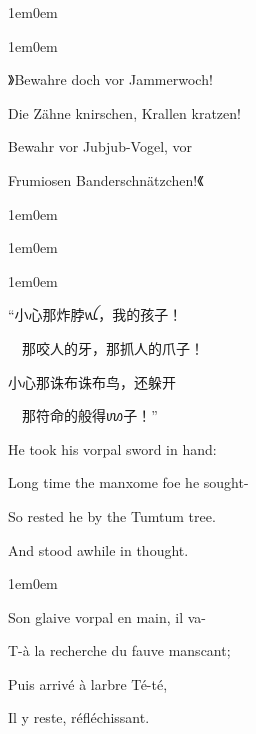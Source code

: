 \documentclass[
  12pt,
  twoside,
  openright,
  oldfontcommands,
]{memoir}
\begin{document}
\hfill\break

\begin{adjustwidth}{1em}{0em}

\begin{adjustwidth}{1em}{0em}

》Bewahre doch vor Jammerwoch!

Die Zähne knirschen, Krallen kratzen!

Bewahr\textquotesingle{} vor Jubjub-Vogel, vor

Frumiosen Banderschnätzchen!《

\end{adjustwidth}

\end{adjustwidth}

\hfill\break

\begin{adjustwidth}{1em}{0em}

\begin{adjustwidth}{1em}{0em}

\begin{adjustwidth}{1em}{0em}

``小心那炸脖{\gebfont ꪡ}，我的孩子！

　那咬人的牙，那抓人的爪子！

小心那诛布诛布鸟，还躲开

　那符命的般得{\gebfont ꪪ}子！''

\end{adjustwidth}

\end{adjustwidth}

\end{adjustwidth}

\hfill\break

He took his vorpal sword in hand:

Long time the manxome foe he sought-

So rested he by the Tumtum tree.

And stood awhile in thought.

\hfill\break

\begin{adjustwidth}{1em}{0em}

Son glaive vorpal en main, il va-

T-à la recherche du fauve manscant;

Puis arrivé à l\textquotesingle arbre Té-té,

Il y reste, réfléchissant.

\end{adjustwidth}
\end{document}
